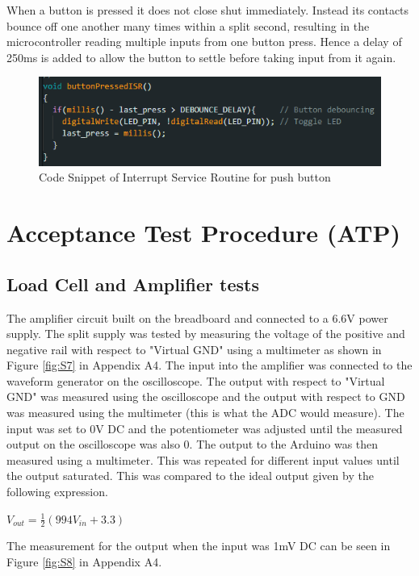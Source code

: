 \documentclass[class=report,11pt,crop=false]{standalone}
\begin{document}
	When a button is pressed it does not close shut immediately. Instead its contacts bounce off one another many times within a split second, resulting in the microcontroller reading multiple inputs from one button press. Hence a delay of 250ms is added to allow the button to settle before taking input from it again.  
	\begin{figure}[h!]
		\centering
		\includegraphics[width=0.7\linewidth]{Figures/ButtonPressed.png}
		\caption{Code Snippet of Interrupt Service Routine for push button}
		\label{fig:S16}
	\end{figure}
	
	\section{Acceptance Test Procedure (ATP)}
	\subsection{Load Cell and Amplifier tests}
	The amplifier circuit built on the breadboard and connected to a 6.6V power supply. The split supply was tested by measuring the voltage of the positive and negative rail with respect to "Virtual GND" using a multimeter as shown in Figure \ref{fig:S7} in Appendix A4.
	The input into the amplifier was connected to the waveform generator on the oscilloscope. The output with respect to "Virtual GND" was measured using the oscilloscope and the output with respect to GND was measured using the multimeter (this is what the ADC would measure). The input was set to 0V DC and the potentiometer was adjusted until the measured output on the oscilloscope was also 0. The output to the Arduino was then measured using a multimeter. This was repeated for different input values until the output saturated. This was compared to the ideal output given by the following expression.
	\begin{center}
		$V_{out}=\frac{1}{2}\left(994V_{in} + 3.3\right)$ \\
	\end{center}
	
	The measurement for the output when the input was 1mV DC can be seen in Figure \ref{fig:S8} in Appendix A4.
	
\end{document}
